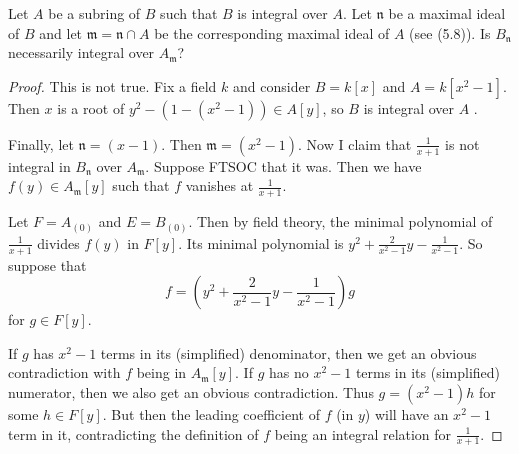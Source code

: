 \begin{exercise}
	Let $A$ be a subring of $B$ such that $B$ is integral over $A$. Let $\mathfrak{n}$ be a maximal ideal of $B$ and let $\mathfrak{m} = \mathfrak{n} \cap A$ be the corresponding maximal ideal of $A$ (see (5.8)). Is $B_{\mathfrak{n}}$ necessarily integral over $A_\mathfrak{m}$?
\end{exercise}
\begin{proof}
	This is not true.
	Fix a field $k $ and consider $B = k[x] $ and $A = k[x^2-1] $.
	Then $x $ is a root of $y^2 - (1 - (x^2-1)) \in A[y] $, so $B $ is integral over $A $ .

	Finally, let $\mathfrak{n} = (x-1) $.
	Then $\mathfrak{m} = (x^2-1) $.
	Now I claim that $\frac{1}{x+1} $ is not integral in $B_{\mathfrak{n}} $ over $A_{\mathfrak{m}} $.
	Suppose FTSOC that it was.
	Then we have $f(y) \in A_{\mathfrak{m}}[y] $ such that $f $ vanishes at $\frac{1}{x+1} $.

	Let $F = A_{(0)} $ and $E = B_{(0)} $.
	Then by field theory, the minimal polynomial of $\frac{1}{x+1} $ divides $f(y) $ in $F[y]$.
	Its minimal polynomial is $y^2 + \frac{2}{x^2-1}y - \frac{1}{x^2-1} $.
	So suppose that
	\begin{equation}\label{eqn:5.4.1}
		f = (y^2+\frac{2}{x^2-1}y - \frac{1}{x^2-1})g
	\end{equation}
	for $g \in F[y] $.

	If $g $ has $x^2-1 $ terms in its (simplified) denominator, then we get an obvious contradiction with $f $ being in $A_{\mathfrak{m}}[y] $.
	If $g $ has no $x^2-1 $	terms in its (simplified) numerator, then we also get an obvious contradiction.
	Thus $g = (x^2-1)h$ for some $h \in F[y] $.
	But then the leading coefficient of $f $ (in $y $) will have an $x^2-1 $ term in it, contradicting the definition of $f $ being an integral relation for $\frac{1}{x+1} $.
\end{proof}

